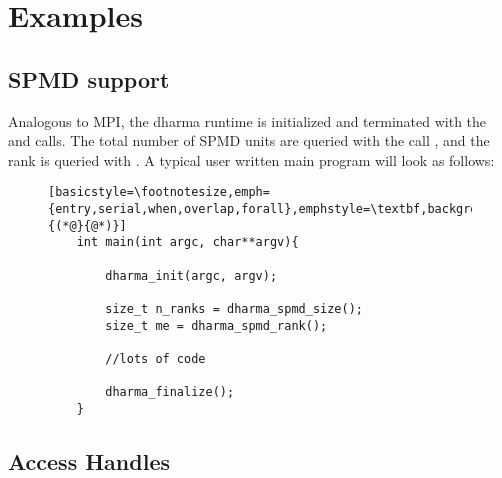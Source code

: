 \chapter{Examples}
\label{chap:examples}


\section{SPMD support}

Analogous to MPI, the dharma runtime is initialized and terminated with the  
and  calls. The total number of SPMD units are queried with the call , 
and the rank is queried with . A typical user written main program will look as follows:

\begin{figure}[h!]
\begin{lstlisting}[basicstyle=\footnotesize,emph={entry,serial,when,overlap,forall},emphstyle=\textbf,backgroundcolor=\color{grayish},framexleftmargin=1em,numbers=left,numberstyle=\tiny,numbersep=5pt,escapeinside={(*@}{@*)}]
	int main(int argc, char**argv){

		dharma_init(argc, argv);

		size_t n_ranks = dharma_spmd_size();
		size_t me = dharma_spmd_rank();

		//lots of code

		dharma_finalize();
	}
\end{lstlisting}
\end{figure}


\section{Access Handles}
